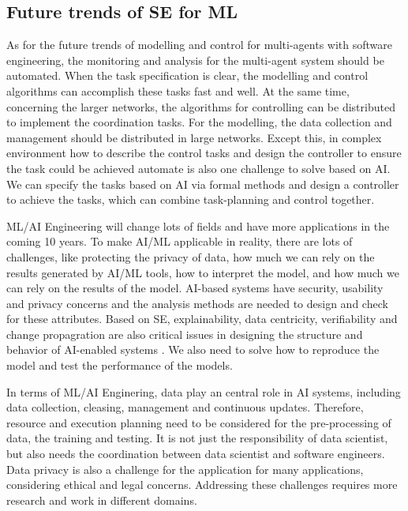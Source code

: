 \documentclass[11pt]{article}
\begin{document}
\subsection*{Future trends of SE for ML }
As for the future trends of modelling and control for multi-agents with software engineering, the monitoring and analysis for the multi-agent system should be automated. When the task specification is clear, the modelling and control algorithms can accomplish these tasks fast and well. At the same time, concerning the larger networks, the algorithms for controlling can be distributed to implement the coordination tasks. For the modelling, the data collection and management should be distributed in large networks.  Except this, in complex environment how to describe the control tasks and design the controller to ensure the task could be achieved automate is also one challenge to solve based on AI. We can specify the tasks based on AI via formal methods and design a controller to achieve the tasks, which can combine task-planning and control together.

ML/AI Engineering will change lots of fields and have more applications in the coming 10 years.   To make AI/ML applicable in reality, there are lots of challenges, like protecting the privacy of data, how much we can rely on the results generated by AI/ML tools, how to interpret the model, and how much we can rely on the results of the model.  AI-based systems have security, usability and privacy concerns and the analysis methods are needed to design and check for these attributes. Based on SE, explainability, data centricity, verifiability and change propagration are also critical issues in designing the structure and behavior of AI-enabled systems \cite{ozkaya2020really}.  We also need to solve how to reproduce the model and test the performance of the models.  

 In terms of ML/AI Enginering, data  play an central role in AI systems, including data collection, cleasing, management and continuous updates. Therefore, resource and execution planning need to be considered for the pre-processing of data, the training and testing. It is not just the responsibility of data scientist, but also needs the coordination between data scientist and software engineers. Data privacy is also a challenge for the application for many applications, considering ethical and legal concerns. Addressing these challenges requires more research and work in different domains. 
\end{document}
